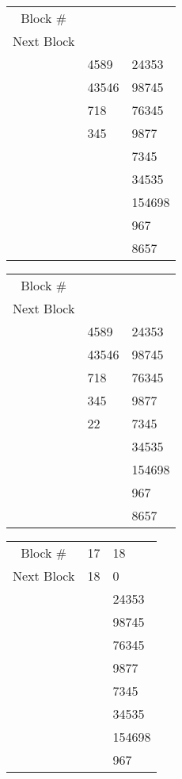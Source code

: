 \documentclass[a4paper,11pt]{exam}
\begin{document}
\begin{questions}
\begin{tabular}{|c|p{3.25em}|p{3.25em}|}
\hline
Block \# & & \\ \cline{1-3}
Next Block & & \\ \cline{1-3}
\multirow{5}{*}{} & 4589 & 24353 \\ \cline{2-3}
	& 43546 & 98745 \\ \cline{2-3}
	& 718 & 76345 \\ \cline{2-3}
	& 345 & 9877 \\ \cline{2-3}
	&  & 7345 \\ \cline{2-3}
	&  & 34535 \\ \cline{2-3}
	&  & 154698 \\ \cline{2-3}
	&  & 967 \\ \cline{2-3}
	&  & 8657 \\ \cline{1-3}
\end{tabular}
\begin{tabular}{|c|p{3.25em}|p{3.25em}|}
\hline
Block \# & & \\ \cline{1-3}
Next Block & & \\ \cline{1-3}
\multirow{5}{*}{} & 4589 & 24353 \\ \cline{2-3}
	& 43546 & 98745 \\ \cline{2-3}
	& 718 & 76345 \\ \cline{2-3}
	& 345 & 9877 \\ \cline{2-3}
	& 22 & 7345 \\ \cline{2-3}
	&  & 34535 \\ \cline{2-3}
	&  & 154698 \\ \cline{2-3}
	&  & 967 \\ \cline{2-3}
	&  & 8657 \\ \cline{1-3}
\end{tabular}
\begin{tabular}{|c|p{3.25em}|p{3.25em}|}
\hline
Block \# & 17 & 18 \\ \cline{1-3}
Next Block & 18 & 0 \\ \cline{1-3}
\multirow{5}{*}{} & & 24353 \\ \cline{2-3}
	&  & 98745 \\ \cline{2-3}
	&  & 76345 \\ \cline{2-3}
	&  & 9877 \\ \cline{2-3}
	&  & 7345 \\ \cline{2-3}
	&  & 34535 \\ \cline{2-3}
	&  & 154698 \\ \cline{2-3}
	&  & 967 \\ \cline{2-3}

\end{tabular}
\end{questions}
\end{document}
